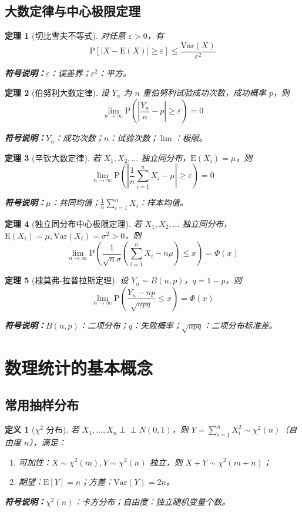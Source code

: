 \documentclass{article}
\newcommand{\E}{\mathrm{E}}
\newcommand{\D}{\mathrm{Var}}
\newcommand{\Prob}{\mathrm{P}}
\newcommand{\indep}{\perp \!\!\! \perp}
\newcommand{\symnote}[1]{\par\noindent\textbf{符号说明：}#1\par}
\theoremstyle{mytheorem}
\newtheorem{theorem}{定理}[section]
\newtheorem{definition}{定义}[section]
\begin{document}
\subsection{大数定律与中心极限定理}
\begin{theorem}[切比雪夫不等式]
对任意 $\varepsilon > 0$，有
$$
\Prob\left[|X-\E(X)| \ge \varepsilon\right] \le \frac{\D(X)}{\varepsilon^2}
$$
\symnote{$\varepsilon$：误差界；$\varepsilon^2$：平方。}
\end{theorem}

\begin{theorem}[伯努利大数定律]
设 $Y_n$ 为 $n$ 重伯努利试验成功次数，成功概率 $p$，则
$$
\lim_{n \to \infty} \Prob\left(\left|\frac{Y_n}{n} - p\right| \ge \varepsilon\right) = 0
$$
\symnote{$Y_n$：成功次数；$n$：试验次数；$\lim$：极限。}
\end{theorem}

\begin{theorem}[辛钦大数定律]
若 $X_1,X_2,\dots$ 独立同分布，$\E(X_i)=\mu$，则
$$
\lim_{n \to \infty} \Prob\left(\left|\frac{1}{n}\sum_{i=1}^n X_i - \mu\right| \ge \varepsilon\right) = 0
$$
\symnote{$\mu$：共同均值；$\frac{1}{n}\sum_{i=1}^n X_i$：样本均值。}
\end{theorem}

\begin{theorem}[独立同分布中心极限定理]
若 $X_1,X_2,\dots$ 独立同分布，$\E(X_i)=\mu, \D(X_i)=\sigma^2>0$，则
$$
\lim_{n \to \infty} \Prob\left( \frac{1}{\sqrt{n}\sigma} \left( \sum_{i=1}^n X_i - n\mu \right) \le x \right) = \Phi(x)
$$
\end{theorem}

\begin{theorem}[棣莫弗-拉普拉斯定理]
设 $Y_n \sim B(n,p)$，$q=1-p$，则
$$
\lim_{n \to \infty} \Prob\left( \frac{Y_n - np}{\sqrt{npq}} \le x \right) = \Phi(x)
$$
\symnote{$B(n,p)$：二项分布；$q$：失败概率；$\sqrt{npq}$：二项分布标准差。}
\end{theorem}

\section{数理统计的基本概念}
\subsection{常用抽样分布}
\begin{definition}[$\chi^2$ 分布]
若 $X_1,\dots,X_n \indep N(0,1)$，则 $Y = \sum_{i=1}^n X_i^2 \sim \chi^2(n)$（自由度 $n$），满足：
\begin{enumerate}
    \item 可加性：$X \sim \chi^2(m), Y \sim \chi^2(n)$ 独立，则 $X+Y \sim \chi^2(m+n)$；
    \item 期望：$\E[Y] = n$；方差：$\D(Y) = 2n$。
\end{enumerate}
\symnote{$\chi^2(n)$：卡方分布；自由度：独立随机变量个数。}
\end{definition}
\end{document}
